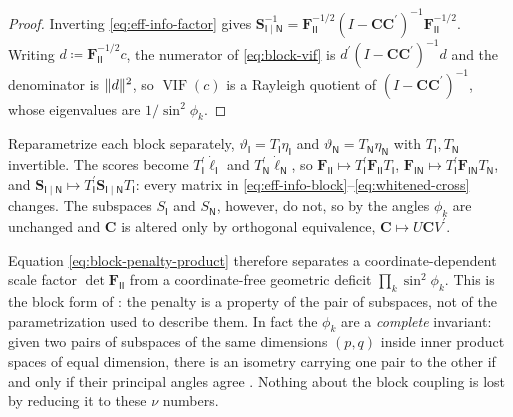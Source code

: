 \documentclass{IEEEtran}
\begin{document}
\begin{proof}
  Inverting \eqref{eq:eff-info-factor} gives $\mathbf{S}_{\mathsf{I}\mid\mathsf{N}}^{-1} = \mathbf{F}_{\mathsf{II}}^{-1/2}(I - \mathbf{C}\mathbf{C}^{\prime})^{-1}\mathbf{F}_{\mathsf{II}}^{-1/2}$. Writing $d \coloneq \mathbf{F}_{\mathsf{II}}^{-1/2}c$, the numerator of \eqref{eq:block-vif} is $d^{\prime}(I - \mathbf{C}\mathbf{C}^{\prime})^{-1}d$ and the denominator is $\lVert d\rVert^{2}$, so $\operatorname{VIF}(c)$ is a Rayleigh quotient of $(I-\mathbf{C}\mathbf{C}^{\prime})^{-1}$, whose eigenvalues are $1/\sin^{2}\phi_{k}$.
\end{proof}

\begin{remark}
  \label{rem:angle-invariance}
  Reparametrize each block separately, $\vartheta_{\mathsf{I}} = T_{\mathsf{I}}\eta_{\mathsf{I}}$ and $\vartheta_{\mathsf{N}} = T_{\mathsf{N}}\eta_{\mathsf{N}}$ with $T_{\mathsf{I}}, T_{\mathsf{N}}$ invertible. The scores become $T_{\mathsf{I}}^{\prime}\dot{\ell}_{\mathsf{I}}$ and $T_{\mathsf{N}}^{\prime}\dot{\ell}_{\mathsf{N}}$, so $\mathbf{F}_{\mathsf{II}} \mapsto T_{\mathsf{I}}^{\prime}\mathbf{F}_{\mathsf{II}}T_{\mathsf{I}}$, $\mathbf{F}_{\mathsf{IN}} \mapsto T_{\mathsf{I}}^{\prime}\mathbf{F}_{\mathsf{IN}}T_{\mathsf{N}}$, and $\mathbf{S}_{\mathsf{I}\mid\mathsf{N}} \mapsto T_{\mathsf{I}}^{\prime}\mathbf{S}_{\mathsf{I}\mid\mathsf{N}}T_{\mathsf{I}}$: every matrix in \eqref{eq:eff-info-block}--\eqref{eq:whitened-cross} changes. The subspaces $S_{\mathsf{I}}$ and $S_{\mathsf{N}}$, however, do not, so by  the angles $\phi_{k}$ are unchanged and $\mathbf{C}$ is altered only by orthogonal equivalence, $\mathbf{C} \mapsto U\mathbf{C}V^{\prime}$.

  Equation \eqref{eq:block-penalty-product} therefore separates a coordinate-dependent scale factor $\det \mathbf{F}_{\mathsf{II}}$ from a coordinate-free geometric deficit $\prod_{k}\sin^{2}\phi_{k}$. This is the block form of : the penalty is a property of the pair of subspaces, not of the parametrization used to describe them. In fact the $\phi_{k}$ are a \emph{complete} invariant: given two pairs of subspaces of the same dimensions $(p,q)$ inside inner product spaces of equal dimension, there is an isometry carrying one pair to the other if and only if their principal angles agree \cite{bjorck1973}. Nothing about the block coupling is lost by reducing it to these $\nu$ numbers.
\end{remark}
\end{document}
